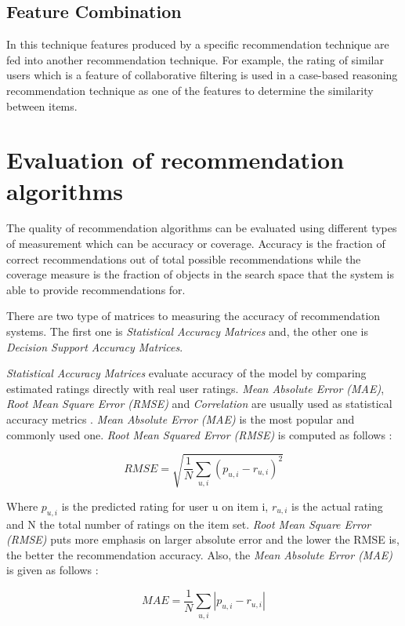 \documentclass[conference]{IEEEtran}
\begin{document}
\subsection{Feature Combination}\label{DD}
In this technique features produced by a speciﬁc recommendation technique are fed into another recommendation technique. For example,
the rating of similar users which is a feature of collaborative
ﬁltering is used in a case-based reasoning recommendation
technique as one of the features to determine the similarity
between items.

\section{Evaluation of recommendation algorithms}
The quality of recommendation algorithms can be evaluated using different types of measurement which can be accuracy or coverage. Accuracy is the fraction of correct recommendations out of total possible recommendations while the coverage measure is the fraction of objects in the search space that the system is able to provide recommendations for.

There are two type of matrices to measuring the accuracy of recommendation systems. The first one is \textit{Statistical Accuracy Matrices} and, the other one is \textit{Decision Support Accuracy Matrices}.

\textit{Statistical Accuracy Matrices} evaluate accuracy of the model by comparing estimated ratings directly with real user ratings. \textit{Mean Absolute Error (MAE)}, \textit{Root Mean Square Error (RMSE)} and \textit{Correlation} are usually used as statistical accuracy metrics \cite{b1}. \textit{Mean Absolute Error (MAE)} is the most popular and commonly used one. \textit{Root Mean Squared Error (RMSE)} is computed as follows \cite{b13}:

\begin{equation}
    RMSE = \sqrt{\frac{1}{N}\sum_{u, i} (p_{u, i}-r_{u, i})^2}
\end{equation}

Where \(p_{u, i}\) is the predicted rating for user u on item i, \(r_{u,i}\) is the actual rating and N the total number of ratings on the item set. \textit{Root Mean Square Error (RMSE)} puts more emphasis on
larger absolute error and the lower the RMSE is, the better the recommendation accuracy. Also, the \textit{Mean Absolute Error (MAE)} is given as follows \cite{b13}:

\begin{equation}
    MAE = \frac{1}{N}\sum_{u, i} \left|{p_{u, i}-r_{u, i}}\right|
\end{equation}
\end{document}
